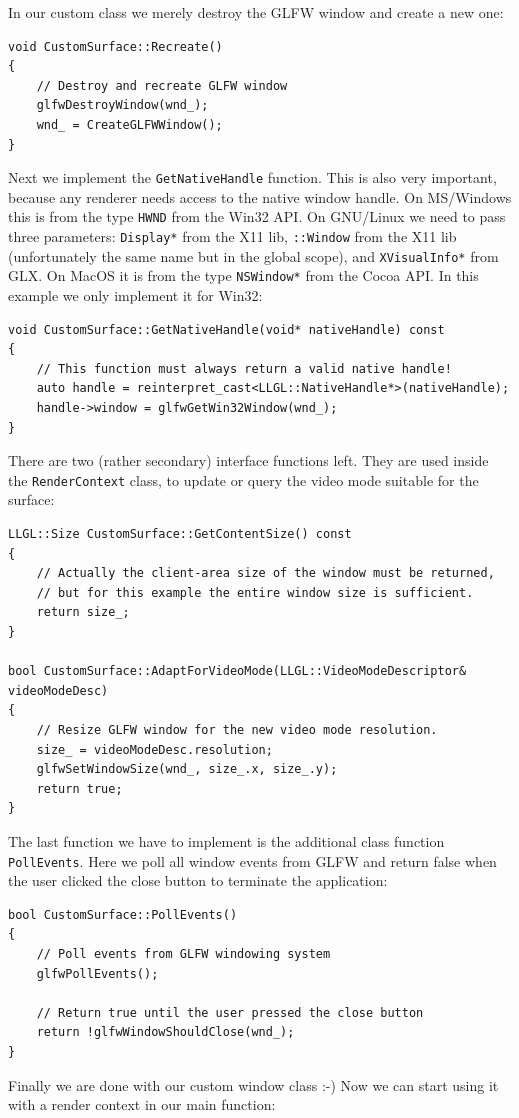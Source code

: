 \documentclass{article}
\begin{document}
In our custom class we merely destroy the GLFW window and create a new one:
\begin{lstlisting}
void CustomSurface::Recreate()
{
	// Destroy and recreate GLFW window
	glfwDestroyWindow(wnd_);
	wnd_ = CreateGLFWWindow();
}
\end{lstlisting}
Next we implement the \texttt{GetNativeHandle} function. This is also very important,
because any renderer needs access to the native window handle.
On MS/Windows this is from the type \texttt{HWND} from the Win32 API.
On GNU/Linux we need to pass three parameters: \texttt{Display*} from the X11 lib,
\texttt{::Window} from the X11 lib (unfortunately the same name but in the global scope),
and \texttt{XVisualInfo*} from GLX.
On MacOS it is from the type \texttt{NSWindow*} from the Cocoa API.
In this example we only implement it for Win32:
\begin{lstlisting}
void CustomSurface::GetNativeHandle(void* nativeHandle) const
{
	// This function must always return a valid native handle!
	auto handle = reinterpret_cast<LLGL::NativeHandle*>(nativeHandle);
	handle->window = glfwGetWin32Window(wnd_);
}
\end{lstlisting}
There are two (rather secondary) interface functions left.
They are used inside the \texttt{RenderContext} class, to update or query the video mode suitable for the surface:
\begin{lstlisting}
LLGL::Size CustomSurface::GetContentSize() const
{
	// Actually the client-area size of the window must be returned,
	// but for this example the entire window size is sufficient.
	return size_;
}

bool CustomSurface::AdaptForVideoMode(LLGL::VideoModeDescriptor& videoModeDesc)
{
	// Resize GLFW window for the new video mode resolution.
	size_ = videoModeDesc.resolution;
	glfwSetWindowSize(wnd_, size_.x, size_.y);
	return true;
}
\end{lstlisting}
The last function we have to implement is the additional class function \texttt{PollEvents}.
Here we poll all window events from GLFW and return false when the user
clicked the close button to terminate the application:
\begin{lstlisting}
bool CustomSurface::PollEvents()
{
	// Poll events from GLFW windowing system
	glfwPollEvents();
	
	// Return true until the user pressed the close button
	return !glfwWindowShouldClose(wnd_);
}
\end{lstlisting}
Finally we are done with our custom window class :-) Now we can start using it with a render context in our main function:
\end{document}
